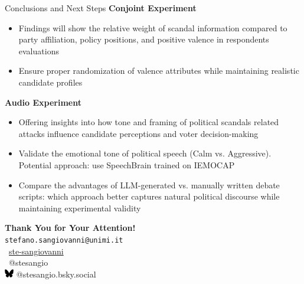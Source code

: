 \documentclass[9pt, aspectratio=169]{beamer}
\newcommand{\customcite}[1]{\textcolor{blue}{\parencite{#1}}}
\begin{document}
\begin{frame}{Conclusions and Next Steps}
\textbf{Conjoint Experiment}
\begin{itemize}
    \item Findings will show the relative weight of scandal information compared to party affiliation, policy positions, and positive valence in respondents evaluations \vspace{0.2cm}
    \item Ensure proper randomization of valence attributes while maintaining realistic candidate profiles 

\end{itemize}
\vspace{0.2cm}
\textbf{Audio Experiment}
\begin{itemize}
    \item Offering insights into how tone and framing of political scandals related attacks influence candidate perceptions and voter decision-making
    \vspace{0.2cm}
    \item Validate the emotional tone of political speech (Calm vs. Aggressive). Potential approach: use SpeechBrain \customcite{speechbrain} trained on IEMOCAP
    \vspace{0.2cm}
    \item Compare the advantages of LLM-generated vs. manually written debate scripts: which approach better captures natural political discourse while maintaining experimental validity
\end{itemize}
\end{frame}

\begin{frame}[plain]
\centering
\vspace{2cm}
\textbf{\large Thank You for Your Attention!} \\ [0.2cm] 
\texttt{stefano.sangiovanni@unimi.it} \\[3cm]

\faGithub\ \href{https://github.com/ste-sangiovanni}{ste-sangiovanni} \\[0.1cm]
\faTwitter\ @stesangio \\ 
\includegraphics[width=0.03\textwidth]{images/Bluesky_logo_(black).svg.png} @stesangio.bsky.social
\vspace{0.2cm}
\end{frame}
\end{document}
